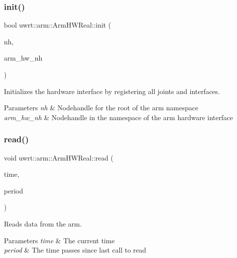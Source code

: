 \subsubsection{\texorpdfstring{init()}{init()}}
{\footnotesize\ttfamily bool uwrt\+::arm\+::\+Arm\+H\+W\+Real\+::init (\begin{DoxyParamCaption}\item[{ros\+::\+Node\+Handle \&}]{nh,  }\item[{ros\+::\+Node\+Handle \&}]{arm\+\_\+hw\+\_\+nh }\end{DoxyParamCaption})\hspace{0.3cm}{\ttfamily [virtual]}}



Initializes the hardware interface by registering all joints and interfaces. 


\begin{DoxyParams}{Parameters}
{\em nh} & Nodehandle for the root of the arm namespace \\
\hline
{\em arm\+\_\+hw\+\_\+nh} & Nodehandle in the namespace of the arm hardware interface \\
\hline
\end{DoxyParams}
\mbox{\label{classuwrt_1_1arm_1_1_arm_h_w_real_a7a4704f71c0652269a2e9c10907ca8b1}} 
\subsubsection{\texorpdfstring{read()}{read()}}
{\footnotesize\ttfamily void uwrt\+::arm\+::\+Arm\+H\+W\+Real\+::read (\begin{DoxyParamCaption}\item[{const ros\+::\+Time \&}]{time,  }\item[{const ros\+::\+Duration \&}]{period }\end{DoxyParamCaption})\hspace{0.3cm}{\ttfamily [virtual]}}



Reads data from the arm. 


\begin{DoxyParams}{Parameters}
{\em time} & The current time \\
\hline
{\em period} & The time passes since last call to read \\
\hline
\end{DoxyParams}


